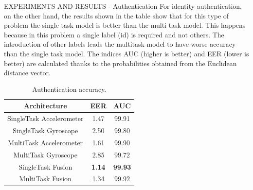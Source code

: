 \documentclass[10pt]{beamer}
\begin{document}
\begin{frame}{EXPERIMENTS AND RESULTS - Authentication}
    For identity authentication, on the other hand, the results shown in the table show that for this type of problem the single task model is better than the multi-task model. This happens because in this problem a single label (id) is required and not others. The introduction of other labels leads the multitask model to have worse accuracy than the single task model. The indices AUC (higher is better) and EER (lower is better) are calculated thanks to the probabilities obtained from the Euclidean distance vector.
    \begin{table}[h!]
        \centering
        \begin{adjustbox}{max width=\textwidth}
        \begin{tabular}{|c|cc|}
            \hline
            Architecture & EER & AUC\\
            \hline
            SingleTask Accelerometer & 1.47 & 99.91\\
            SingleTask Gyroscope & 2.50 & 99.80\\
            \hline
            MultiTask Accelerometer & 1.61 & 99.90\\
            MultiTask Gyroscope & 2.85 & 99.72\\
            \hline
            SingleTask Fusion & \bfseries{1.14} & \bfseries{99.93}\\
            \hline
            MultiTask Fusion & 1.34 & 99.92\\
            \hline
        \end{tabular}
        \end{adjustbox}
        \caption{Authentication accuracy.}
        \label{Authentication}
    \end{table}
\end{frame}
\end{document}
